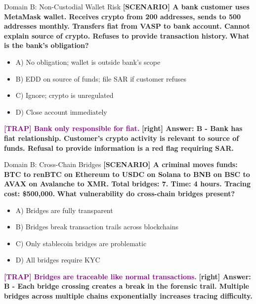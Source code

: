 \documentclass[11pt,a4paper]{beamer}
\newcommand{\trap}[1]{\textcolor{purple}{\textbf{[TRAP] #1}}}
\newcommand{\correct}[1]{\textcolor{green!50!black}{\textbf{[right] #1}}}
\newcommand{\scenario}[1]{\textcolor{blue!70!black}{\textbf{[SCENARIO] #1}}}
\begin{document}
\begin{frame}{Domain B: Non-Custodial Wallet Risk}
\scenario{A bank customer uses MetaMask wallet. Receives crypto from 200 addresses, sends to 500 addresses monthly. Transfers fiat from VASP to bank account. Cannot explain source of crypto. Refuses to provide transaction history.}
\vspace{0.2cm}
\textbf{What is the bank's obligation?}
\vspace{0.2cm}
\begin{itemize}
    \item A) No obligation; wallet is outside bank's scope
    \item B) EDD on source of funds; file SAR if customer refuses
    \item C) Ignore; crypto is unregulated
    \item D) Close account immediately
\end{itemize}
\vspace{0.2cm}
\trap{Bank only responsible for fiat.}
\correct{Answer: B - Bank has fiat relationship. Customer's crypto activity is relevant to source of funds. Refusal to provide information is a red flag requiring SAR.}
\end{frame}

\begin{frame}{Domain B: Cross-Chain Bridges}
\scenario{A criminal moves funds: BTC to renBTC on Ethereum to USDC on Solana to BNB on BSC to AVAX on Avalanche to XMR. Total bridges: 7. Time: 4 hours. Tracing cost: \$500,000.}
\vspace{0.2cm}
\textbf{What vulnerability do cross-chain bridges present?}
\vspace{0.2cm}
\begin{itemize}
    \item A) Bridges are fully transparent
    \item B) Bridges break transaction trails across blockchains
    \item C) Only stablecoin bridges are problematic
    \item D) All bridges require KYC
\end{itemize}
\vspace{0.2cm}
\trap{Bridges are traceable like normal transactions.}
\correct{Answer: B - Each bridge crossing creates a break in the forensic trail. Multiple bridges across multiple chains exponentially increases tracing difficulty.}
\end{frame}
\end{document}
